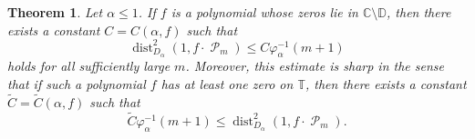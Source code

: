\documentclass[11 pt,reqno]{amsart}
\newtheorem{thm}{Theorem}[section]
\theoremstyle{definition}
\theoremstyle{remark}
\numberwithin{equation}{section} \numberwithin{figure}{section}
\newcommand{\CC}{{\mathbb C}}
\newcommand{\DD}{{\mathbb D}}
\newcommand{\TT}{{\mathbb T}}
\DeclareMathOperator{\Pol}{{\mathcal P}}
\DeclareMathOperator{\dist}{dist}
\begin{document}
\begin{thm}\label{distForPol}
            Let $\alpha\leq 1$.  If $f$ is a polynomial whose zeros lie in
            $\CC\setminus\DD$, then there exists a constant $C=C(\alpha,f)$ such that
            \begin{equation}\label{distEstimate}
                        \dist_{D_{\alpha}}^{2}(1,f\cdot\Pol_{m})
                        \leq C\varphi_{\alpha}^{-1}(m+1)
            \end{equation}
            holds for all sufficiently large $m$.  Moreover, this estimate is sharp in the sense that if
            such a polynomial $f$ has at least one zero on $\TT$, then there exists a constant
            $\tilde{C}= \tilde{C}(\alpha,f)$ such that
      \begin{equation*}
          \tilde{C} \varphi_{\alpha}^{-1}(m+1) \leq \dist_{D_{\alpha}}^{2}(1,f\cdot\Pol_{m}).
      \end{equation*}
\end{thm}
\end{document}
